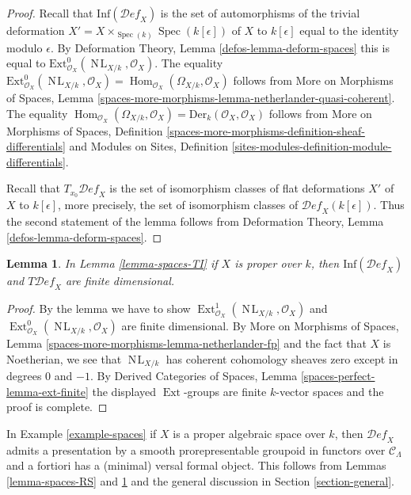 \documentclass{stacks-project}
\theoremstyle{plain}
\newtheorem{lemma}[subsection]{Lemma}
\theoremstyle{definition}
\theoremstyle{remark}
\numberwithin{equation}{subsection}
\def\Spec{\mathop{\mathrm{Spec}}}
\def\Hom{\mathop{\mathrm{Hom}}\nolimits}
\def\Ext{\mathop{\mathrm{Ext}}\nolimits}
\def\NL{\mathop{N\!L}\nolimits}
\def\Deformationcategory{\mathcal{D}\!\mathit{ef}}
\begin{document}
\begin{proof}
Recall that $\text{Inf}(\Deformationcategory_X)$ is the set of
automorphisms of the trivial deformation
$X' = X \times_{\Spec(k)} \Spec(k[\epsilon])$ of $X$ to $k[\epsilon]$
equal to the identity modulo $\epsilon$.
By Deformation Theory, Lemma \ref{defos-lemma-deform-spaces}
this is equal to $\text{Ext}^0_{\mathcal{O}_X}(\NL_{X/k}, \mathcal{O}_X)$.
The equality $\text{Ext}^0_{\mathcal{O}_X}(\NL_{X/k}, \mathcal{O}_X) =
\Hom_{\mathcal{O}_X}(\Omega_{X/k}, \mathcal{O}_X)$ follows from
More on Morphisms of Spaces, Lemma
\ref{spaces-more-morphisms-lemma-netherlander-quasi-coherent}.
The equality
$\Hom_{\mathcal{O}_X}(\Omega_{X/k}, \mathcal{O}_X) =
\text{Der}_k(\mathcal{O}_X, \mathcal{O}_X)$
follows from More on Morphisms of Spaces, Definition
\ref{spaces-more-morphisms-definition-sheaf-differentials} and
Modules on Sites, Definition
\ref{sites-modules-definition-module-differentials}.

\medskip\noindent
Recall that $T_{x_0}\Deformationcategory_X$ is the set of isomorphism classes
of flat deformations $X'$ of $X$ to $k[\epsilon]$, more precisely,
the set of isomorphism classes of $\Deformationcategory_X(k[\epsilon])$.
Thus the second statement of the lemma follows from
Deformation Theory, Lemma \ref{defos-lemma-deform-spaces}.
\end{proof}

\begin{lemma}
\label{lemma-proper-spaces-TI}
In Lemma \ref{lemma-spaces-TI} if $X$ is proper over $k$, then
$\text{Inf}(\Deformationcategory_X)$ and $T\Deformationcategory_X$ are
finite dimensional.
\end{lemma}

\begin{proof}
By the lemma we have to show
$\Ext^1_{\mathcal{O}_X}(\NL_{X/k}, \mathcal{O}_X)$ and
$\Ext^0_{\mathcal{O}_X}(\NL_{X/k}, \mathcal{O}_X)$ are finite
dimensional. By More on Morphisms of Spaces, Lemma
\ref{spaces-more-morphisms-lemma-netherlander-fp}
and the fact that $X$ is Noetherian, we see that
$\NL_{X/k}$ has coherent cohomology sheaves zero except
in degrees $0$ and $-1$.
By Derived Categories of Spaces, Lemma \ref{spaces-perfect-lemma-ext-finite}
the displayed $\Ext$-groups are finite $k$-vector spaces
and the proof is complete.
\end{proof}

\noindent
In Example \ref{example-spaces} if $X$ is a proper algebraic space over $k$,
then $\Deformationcategory_X$
admits a presentation by a smooth prorepresentable groupoid in functors
over $\mathcal{C}_\Lambda$
and a fortiori has a (minimal) versal formal object. This follows
from Lemmas \ref{lemma-spaces-RS} and
\ref{lemma-proper-spaces-TI}
and the general discussion in Section \ref{section-general}.
\end{document}
